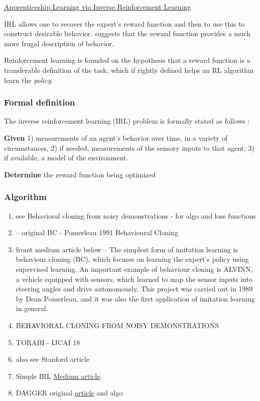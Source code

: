 \documentclass{article}
\begin{document}
\href{https://ai.stanford.edu/~ang/papers/icml04-apprentice.pdf}{Apprenticeship Learning via Inverse Reinforcement Learning}

IRL allows one to recover the expert's reward function and then to use this to construct desirable behavior. \citet{ng2000algorithms} suggests that the reward function provides a much more frugal description of behavior. 

Reinforcement learning is founded on the hypothesis that a reward function is a transferable definition of the task, which if rightly defined helps an RL algorithm learn the \textit{policy}. 

\subsubsection{Formal definition}
The inverse reinforcement learning (IRL) problem is formally stated as follows \citep{ng2000algorithms}:

\textbf{Given} 1) measurements of an agent's behavior over time, in a variety of circumstances, 2) if needed, measurements of the sensory inputs to that agent; 3) if available, a model of the environment.

\textbf{Determine} the reward function being optimized

\subsubsection{Algorithm}
\begin{enumerate}
	\item see \citep{sasaki2020} Behavioral cloning from noisy demonstrations - for algo and loss functions
	
	\item  \cite{Pomerleau1991} -- original BC - Pomerleau 1991 Behavioural Cloning
	\item fromt medium article below -- The simplest form of imitation learning is behaviour cloning (BC), which focuses on learning the expert’s policy using supervised learning. An important example of behaviour cloning is ALVINN, a vehicle equipped with sensors, which learned to map the sensor inputs into steering angles and drive autonomously. This project was carried out in 1989 by Dean Pomerleau, and it was also the first application of imitation learning in general.
	
	\item BEHAVIORAL CLONING FROM NOISY DEMONSTRATIONS
	
	\item TORABI - IJCAI 18
	\item also see Stanford article
	\item Simple IRL \href{https://smartlabai.medium.com/a-brief-overview-of-imitation-learning-8a8a75c44a9c}{Medium article}.
	\item DAGGER original \href{https://www.ri.cmu.edu/pub_files/2011/4/Ross-AISTATS11-NoRegret.pdf}{article} and algo
\end{enumerate}
\end{document}
